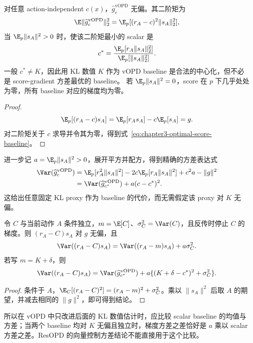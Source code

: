 \begin{proposition}
\label{prop:chapter3-vopd}
对任意 action-independent $c(x)$，$\widehat g^{\mathrm{vOPD}}_c$ 无偏。其二阶矩为
\[
 \E\lVert\widehat g^{\mathrm{vOPD}}_c\rVert_2^2
 =\E_p[(r_A-c)^2\lVert s_A\rVert_2^2],
\]
当 $\E_p\lVert s_A\rVert^2>0$ 时，使该二阶矩最小的 scalar 是
\begin{equation}
 c^*=\frac{\E_p[r_A\lVert s_A\rVert_2^2]}{\E_p[\lVert s_A\rVert_2^2]}.
 \label{eq:chapter3-optimal-score-baseline}
\end{equation}
一般 $c^*\neq K$，因此用 KL 数值 $K$ 作为 vOPD baseline 是合法的中心化，但不必是 score-gradient 方差最优的 baseline。
若 $\E_p\lVert s_A\rVert^2=0$，score 在 $p$ 下几乎处处为零，所有 baseline 对应的梯度均为零。
\end{proposition}

\begin{proof}
\[
 \E_p[(r_A-c)s_A]=\E_p[r_As_A]-c\E_p[s_A]=g.
\]
对二阶矩关于 $c$ 求导并令其为零，得到式~\eqref{eq:chapter3-optimal-score-baseline}。
\end{proof}

进一步记 $a=\E_p\lVert s_A\rVert^2>0$，展开平方并配方，得到精确的方差表达式
\begin{align*}
 \Var(\widehat g_c^{\mathrm{vOPD}})
 &=\E_p[r_A^2\lVert s_A\rVert^2]
   -2c\E_p[r_A\lVert s_A\rVert^2]+c^2a-\lVert g\rVert^2\\
 &=\Var(\widehat g_{c^*}^{\mathrm{vOPD}})+a(c-c^*)^2.
\end{align*}
这给出任意固定 KL proxy 作为 baseline 的代价，而无需假定该 proxy 对 $K$ 无偏。

\begin{proposition}
令 $C$ 与当前动作 $A$ 条件独立，$m=\E[C]$、$\sigma_C^2=\Var(C)$，且反传时停止 $C$ 的梯度。则 $(r_A-C)s_A$ 对 $g$ 无偏，且
\[
 \Var((r_A-C)s_A)
 =\Var((r_A-m)s_A)+a\sigma_C^2.
\]
若写 $m=K+\delta$，则
\[
 \Var((r_A-C)s_A)
 =\Var(\widehat g_{c^*}^{\mathrm{vOPD}})
  +a\{(K+\delta-c^*)^2+\sigma_C^2\}.
\]
\end{proposition}

\begin{proof}
条件于 $A$，$\E_C[(r_A-C)^2]=(r_A-m)^2+\sigma_C^2$。乘以 $\lVert s_A\rVert^2$ 后取 $A$ 的期望，并减去相同的 $\lVert g\rVert^2$，即可得到结论。
\end{proof}

所以在 vOPD 中只改进后面的 KL 数值估计时，应比较 scalar baseline 的均值与方差；当两个 baseline 均对 $K$ 无偏且独立时，梯度方差之差恰好是 $a$ 乘以 scalar 方差之差。ResOPD 的向量控制方差结论不能直接用于这个比较。

